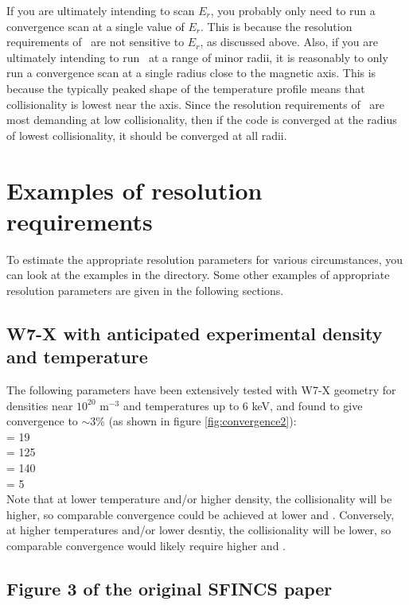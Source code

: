 If you are ultimately intending to scan $E_r$, you probably only need to run a convergence scan
at a single value of $E_r$.  This is because the resolution requirements of \sfincs~are not sensitive to
$E_r$, as discussed above.
Also, if you are ultimately intending to run \sfincs~at a range of minor radii,
it is reasonably to only run a convergence scan at a single radius close to the magnetic axis.
This is because the typically peaked shape of the temperature profile means that
collisionality is lowest near the axis.  Since the resolution requirements of \sfincs~are most
demanding at low collisionality, then if the code is converged at the radius of lowest collisionality,
it should be converged at all radii.

\section{Examples of resolution requirements}

To estimate the appropriate resolution parameters for various circumstances, you can look at
the examples in the  directory. 
Some other examples of appropriate resolution parameters are given in the following sections.

\subsection{W7-X with anticipated experimental density and temperature}
\label{sec:w7xresolution}

The following parameters have been extensively tested with W7-X geometry for densities near $10^{20}$ m$^{-3}$
and temperatures up to 6 keV, and found to give convergence to $\sim 3$\% (as shown in figure \ref{fig:convergence2}):\\
{\ttfamily
\Ntheta = 19 \\
\Nzeta = 125 \\
\Nxi = 140 \\
\Nx = 5 \\
}
Note that at lower temperature and/or higher density, the collisionality will be higher,
so comparable convergence could be achieved at lower  and .
Conversely, at higher temperatures and/or lower desntiy, the collisionality will be lower,
so comparable convergence would likely require higher   and .

\subsection{Figure 3 of the original SFINCS paper}

